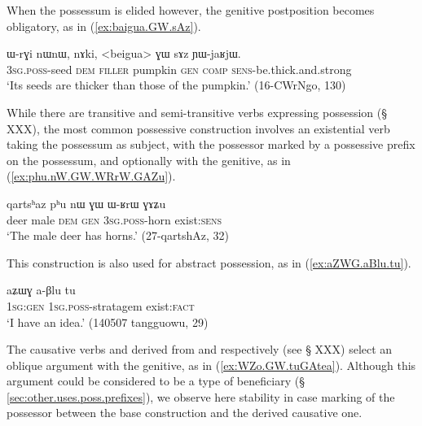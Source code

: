 When the possessum is elided however, the genitive postposition becomes obligatory, as in (\ref{ex:baigua.GW.sAz}).

\begin{exe}
\ex \label{ex:baigua.GW.sAz}
\gll ɯ-rɣi nɯnɯ, nɤki, <beigua> ɣɯ sɤz ɲɯ-jaʁjɯ. \\
\textsc{3sg}.\textsc{poss}-seed \textsc{dem} \textsc{filler}  pumpkin \textsc{gen} \textsc{comp} \textsc{sens}-be.thick.and.strong \\
\glt `Its seeds are thicker than those of the pumpkin.' (16-CWrNgo, 130)
\end{exe}

While there are transitive and semi-transitive verbs expressing possession (§ XXX), the most common possessive construction involves an existential verb taking the possessum as subject, with the possessor marked by a possessive prefix on the possessum, and optionally with the genitive, as in (\ref{ex:phu.nW.GW.WRrW.GAZu}). 

\begin{exe}
\ex \label{ex:phu.nW.GW.WRrW.GAZu}
\gll qartsʰaz pʰu nɯ ɣɯ ɯ-ʁrɯ ɣɤʑu \\
deer male \textsc{dem} \textsc{gen} \textsc{3sg}.\textsc{poss}-horn exist:\textsc{sens} \\
\glt `The male deer has horns.' (27-qartshAz, 32)
\end{exe}

This construction is also used for abstract possession, as in (\ref{ex:aZWG.aBlu.tu}).

\begin{exe}
\ex \label{ex:aZWG.aBlu.tu}
\gll aʑɯɣ a-βlu tu \\
\textsc{1sg}:\textsc{gen} \textsc{1sg}.\textsc{poss}-stratagem exist:\textsc{fact} \\
\glt `I have an idea.' (140507 tangguowu, 29)
\end{exe}

The causative verbs  and  derived from  and  respectively (see § XXX) select an oblique argument with the genitive, as in (\ref{ex:WZo.GW.tuGAtea}). Although this argument could be considered to be a type of beneficiary (§ \ref{sec:other.uses.poss.prefixes}), we observe here stability in case marking of the possessor between the base construction and the derived causative one.

